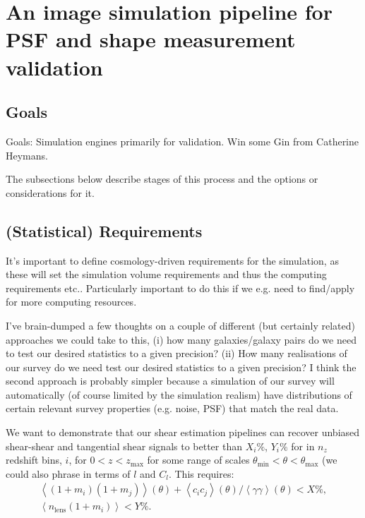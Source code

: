 \documentclass[\docopts]{\docclass}
\begin{document}
\section{An image simulation pipeline for PSF and shape measurement validation}


\subsection{Goals}
Goals: Simulation engines primarily for validation. Win some Gin from Catherine Heymans.

The subsections below describe stages of this process and the options or considerations for it.

\subsection{(Statistical) Requirements}

It's important to define cosmology-driven requirements for the simulation, as these will set the simulation volume requirements and thus the computing requirements etc.. Particularly important to do this if we e.g. need to find/apply for more computing resources.

I've brain-dumped a few thoughts on a couple of different (but certainly related) approaches we could take to this, (i) how many galaxies/galaxy pairs do we need to test our desired statistics to a given precision? (ii) How many realisations of our survey do we need test our desired statistics to a given precision? I think the second approach is probably simpler because a simulation of our survey will automatically (of course limited by the simulation realism) have distributions of certain relevant survey properties (e.g. noise, PSF) that match the real data. 

We want to demonstrate that our shear estimation pipelines can recover unbiased shear-shear and tangential shear signals to better than $X_i\%$, $Y_i\%$  for in $n_z$ redshift bins, $i$, for $0<z<z_{\mathrm{max}}$ for some range of scales $\theta_{\mathrm{min}} < \theta < \theta_{\mathrm{max}}$ (we could also phrase in terms of $l$ and $C_l$. This requires:
\begin{align}
\left<(1+m_i)(1+m_j)\right>(\theta) + \left<c_i c_j\right>(\theta)/\left<\gamma \gamma\right>(\theta) < X\%, \\ 
\left<n_{\mathrm{lens}}(1+m_i)\right> < Y\%.
\end{align}
\end{document}
